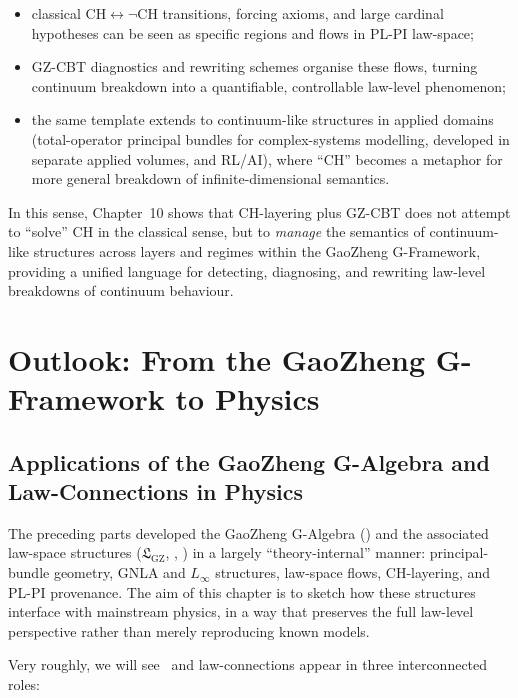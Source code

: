\documentclass[11pt]{book}
\theoremstyle{plain}
\theoremstyle{definition}
\newcommand{\GZLS}{\ensuremath{\mathfrak{L}_{\mathrm{GZ}}}}       \newcommand{\GZLT}{\ensuremath{M_{!w}}}                           \newcommand{\GZLOC}{\ensuremath{A_M}}                             \newcommand{\GZLCurv}{\ensuremath{\mathcal{F}_{\mathrm{law}}}}
\begin{document}
\begin{itemize}
  \item classical CH$\leftrightarrow\neg\mathrm{CH}$ transitions,
        forcing axioms, and large cardinal hypotheses can be seen as
        specific regions and flows in PL-PI law-space;
  \item GZ-CBT diagnostics and rewriting schemes organise these flows,
        turning continuum breakdown into a quantifiable, controllable
        law-level phenomenon;
  \item the same template extends to continuum-like structures in
        applied domains (total-operator principal bundles for complex-systems
        modelling, developed in separate applied volumes, and RL/AI), where “CH” becomes a
        metaphor for more general breakdown of infinite-dimensional
        semantics.
\end{itemize}

In this sense, Chapter~10 shows that CH-layering plus GZ-CBT does not
attempt to “solve” CH in the classical sense, but to \emph{manage} the
semantics of continuum-like structures across layers and regimes
within the GaoZheng G-Framework, providing a unified language for
detecting, diagnosing, and rewriting law-level breakdowns of
continuum behaviour.






\part{Outlook: From the GaoZheng G-Framework to Physics}


\chapter[Applications in Physics]{Applications of the GaoZheng G-Algebra and Law-Connections in Physics}


The preceding parts developed the GaoZheng G-Algebra (\GAlgebra) and
the associated law-space structures (\GZLS, \GZTLC, \GZGMS) in a
largely “theory-internal” manner: principal-bundle geometry, GNLA and
$L_\infty$ structures, law-space flows, CH-layering, and PL-PI
provenance. The aim of this chapter is to sketch how these structures
interface with mainstream physics, in a way that preserves the full
law-level perspective rather than merely reproducing known models.

Very roughly, we will see \GAlgebra\ and law-connections appear in
three interconnected roles:
\end{document}
